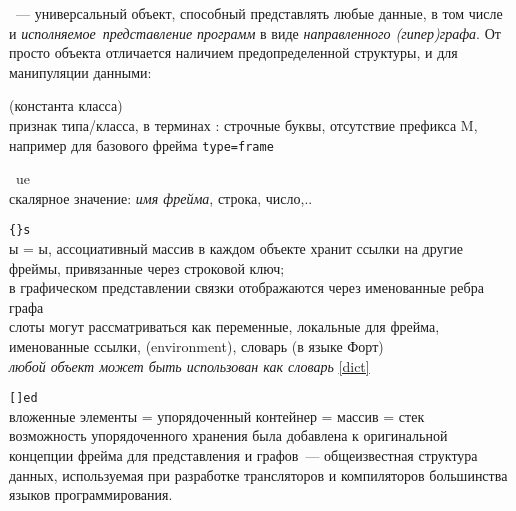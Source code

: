 \clearpage
{}\label{frame}\secdown

\ --- универсальный объект, способный представлять любые данные,
в том числе и \emph{исполняемое\ представление
программ} в виде \textit{направленного (гипер)графа}. От просто объекта отличается
наличием предопределенной структуры, и  для
манипуляции данными:

\begin{description}

    \item{} (константа класса)\\ признак типа/класса, в терминах \met: строчные буквы,
    отсутствие префикса M, например для базового фрейма \verb|type=frame|

    \item{}\ ue\\ скалярное значение: \textit{имя фрейма}, строка, число,..

\end{description}
\begin{description}[nosep]

    \item{}\verb|{}s|\\ ы = ы, ассоциативный массив в каждом объекте
    хранит ссылки на другие фреймы, привязанные через строковой ключ;\\
    в графическом представлении связки отображаются через именованные ребра графа\\
    слоты могут рассматриваться как переменные, локальные для фрейма, именованные ссылки,
     (environment), словарь (в языке Форт)\\
    \textit{любой объект может быть использован как словарь} \ref{dict}

    \item{}\verb|[]ed|\\ вложенные элементы = упорядоченный контейнер = массив = стек\\
    возможность упорядоченного хранения была добавлена к оригинальной концепции фрейма \cite{minsky}
    для представления  и графов\ --- общеизвестная структура данных,
    используемая при разработке трансляторов и компиляторов большинства языков программирования. 
    
\end{description}

